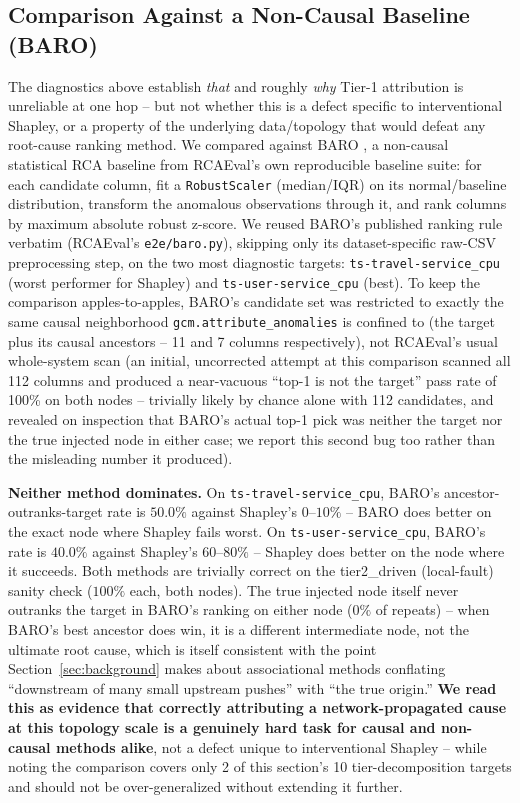 \documentclass[journal, 10pt]{IEEEtran}
\begin{document}
\subsection{Comparison Against a Non-Causal Baseline (BARO)}
\label{sec:baro}
The diagnostics above establish \emph{that} and roughly \emph{why} Tier-1 attribution is unreliable at one hop -- but not whether this is a defect specific to interventional Shapley, or a property of the underlying data/topology that would defeat any root-cause ranking method. We compared against BARO \cite{nguyen2024baro}, a non-causal statistical RCA baseline from RCAEval's own reproducible baseline suite: for each candidate column, fit a \texttt{RobustScaler} (median/IQR) on its normal/baseline distribution, transform the anomalous observations through it, and rank columns by maximum absolute robust z-score. We reused BARO's published ranking rule verbatim (RCAEval's \texttt{e2e/baro.py}), skipping only its dataset-specific raw-CSV preprocessing step, on the two most diagnostic targets: \texttt{ts-travel-service\_cpu} (worst performer for Shapley) and \texttt{ts-user-service\_cpu} (best). To keep the comparison apples-to-apples, BARO's candidate set was restricted to exactly the same causal neighborhood \texttt{gcm.attribute\_anomalies} is confined to (the target plus its causal ancestors -- 11 and 7 columns respectively), not RCAEval's usual whole-system scan (an initial, uncorrected attempt at this comparison scanned all 112 columns and produced a near-vacuous ``top-1 is not the target'' pass rate of 100\% on both nodes -- trivially likely by chance alone with 112 candidates, and revealed on inspection that BARO's actual top-1 pick was neither the target nor the true injected node in either case; we report this second bug too rather than the misleading number it produced).

\textbf{Neither method dominates.} On \texttt{ts-travel-service\_cpu}, BARO's ancestor-outranks-target rate is $50.0\%$ against Shapley's $0$--$10\%$ -- BARO does better on the exact node where Shapley fails worst. On \texttt{ts-user-service\_cpu}, BARO's rate is $40.0\%$ against Shapley's $60$--$80\%$ -- Shapley does better on the node where it succeeds. Both methods are trivially correct on the tier2\_driven (local-fault) sanity check ($100\%$ each, both nodes). The true injected node itself never outranks the target in BARO's ranking on either node ($0\%$ of repeats) -- when BARO's best ancestor does win, it is a different intermediate node, not the ultimate root cause, which is itself consistent with the point Section~\ref{sec:background} makes about associational methods conflating ``downstream of many small upstream pushes'' with ``the true origin.'' \textbf{We read this as evidence that correctly attributing a network-propagated cause at this topology scale is a genuinely hard task for causal and non-causal methods alike}, not a defect unique to interventional Shapley -- while noting the comparison covers only 2 of this section's 10 tier-decomposition targets and should not be over-generalized without extending it further.
\end{document}
